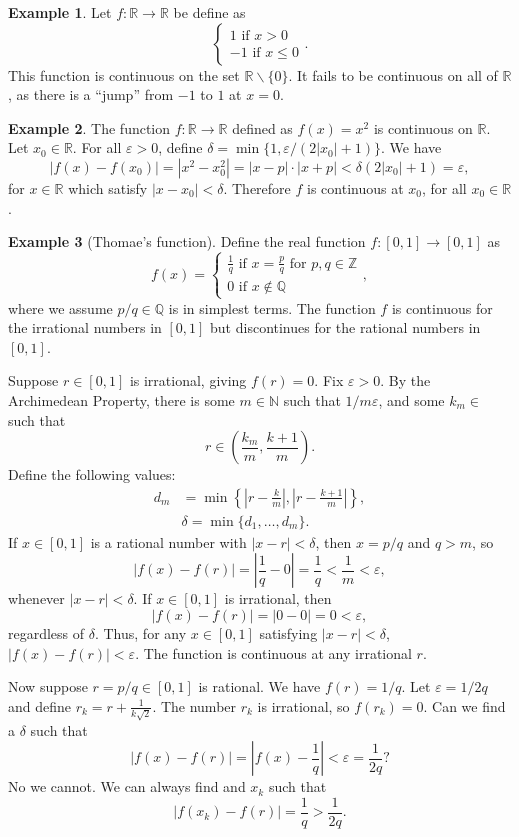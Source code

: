 \documentclass{article}
\newcommand{\N}{\mathbb{N}}
\newcommand{\R}{\mathbb{R}}
\newcommand{\Q}{\mathbb{Q}}
\newcommand{\Z}{\mathbb{Z}}
\theoremstyle{definition}
\newtheorem{example}{Example}[section]
\begin{document}
	\begin{example}
		Let $ f:\R\to\R $ be define as $$ \begin{cases}
			1\text{ if }x>0\\-1\text{ if }x\le0
		\end{cases} .$$
		This function is continuous on the set $ \R\backslash\{0\} $. It fails to be continuous on all of $ \R $, as there is a ``jump'' from $ -1 $ to $ 1 $ at $ x=0 $. 	
	\end{example}
	\begin{example}
		The function $ f:\R\to\R $ defined as $ f(x)=x^2 $ is continuous on $ \R $. Let $ x_0\in\R $. For all $ \varepsilon>0 $, define $ \delta=\min\{1,\varepsilon/(2|x_0|+1)\} $. We have $$|f(x)-f(x_0)|=|x^2-x_0^2|=|x-p|\cdot|x+p|<\delta(2|x_0|+1)=\varepsilon ,$$ for $ x\in \R $ which satisfy $ |x-x_0|<\delta $.  Therefore $ f $ is continuous at $ x_0 $, for all $ x_0\in\R $. 
	\end{example}
	\begin{example}[Thomae's function]
		Define the real function $ f:[0,1]\to[0,1] $ as $$f(x)=\begin{cases}
			\frac{1}{q} \text{ if }x=\frac{p}{q}\text{ for }p,q\in\Z\\
			0\text{ if }x\notin\Q
		\end{cases} ,$$ where we assume $ p/q\in\Q $ is in simplest terms. The function $ f $ is continuous for the irrational numbers in $ [0,1] $ but discontinues for the rational numbers in $ [0,1] $. 
		
		Suppose $ r\in[0,1] $ is irrational, giving $ f(r)=0 $. Fix $ \varepsilon>0 $. By the Archimedean Property, there is some $ m\in\N $ such that $ 1/m \varepsilon$, and some $ k_m\in $ such that $$ r\in\left(\frac{k_m}{m},\frac{k+1}{m}\right) .$$ Define the following values:
		\begin{align*}
			d_m&=\min\left\{\left\lvert r-\frac{k}{m}\right\rvert,\left\lvert r-\frac{k+1}{m}\right\rvert\right\},\\
			&\delta=\min\{d_1,\ldots,d_m\}.
		\end{align*}
		If $ x\in[0,1] $ is a rational number with $ |x-r|<\delta $, then $ x=p/q $ and $ q>m $, so $$|f(x)-f(r)|=\left\lvert \frac{1}{q}-0\right\rvert=\frac{1}{q}<\frac{1}{m}<\varepsilon ,$$ whenever $ |x-r|<\delta $. If $ x\in[0,1] $ is irrational, then $$ |f(x)-f(r)|=|0-0|=0<\varepsilon ,$$ regardless of $ \delta $. Thus, for any $ x\in[0,1] $ satisfying $ |x-r|<\delta $, $ |f(x)-f(r)|<\varepsilon $. The function is continuous at any irrational $ r $.
		
		Now suppose $ r=p/q\in[0,1] $ is rational. We have $ f(r)=1/q $. Let $ \varepsilon=1/2q $ and define $ r_k=r+\frac{1}{k\sqrt{2}} $. The number $ r_k $ is irrational, so $ f(r_k)=0 $. Can we find a $ \delta $ such that $$ |f(x)-f(r)|=\left\lvert f(x)-\frac{1}{q}\right\rvert<\varepsilon=\frac{1}{2q}?$$ No we cannot. We can always find and $ x_k $ such that $$|f(x_k)-f(r)|=\frac{1}{q}>\frac{1}{2q}. $$  
	\end{example}
\end{document}
